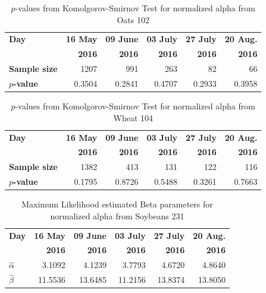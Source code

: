 \documentclass[journal]{IEEEtran}
\begin{document}
\begin{table}[hbt]
  \centering
  \caption{$p$-values from Komolgorov-Smirnov Test for normalized alpha from Oats 102}
  \label{tab:pvalues_alpha_ot102}
  \begin{tabular}{lrrrrr}
    \toprule
    \textbf{Day} & \textbf{16 May} & \textbf{09 June} & \textbf{03 July} & \textbf{27 July} & \textbf{20 Aug.}\\ 
                 & \textbf{2016} & \textbf{2016} & \textbf{2016} & \textbf{2016} & \textbf{2016}\\\midrule
    \textbf{Sample size} & 1207 & 991 & 263 & 82 & 66\\
    \textbf{$p$-value} & 0.3504 & 0.2841 & 0.4707 & 0.2933 & 0.3958\\
    \bottomrule
  \end{tabular}
\end{table}

\begin{table}[hbt]
  \centering
  \caption{$p$-values from Komolgorov-Smirnov Test for normalized alpha from Wheat 104}
  \label{tab:pvalues_alpha_wt104}
  \begin{tabular}{lrrrrr}
    \toprule
    \textbf{Day} & \textbf{16 May} & \textbf{09 June} & \textbf{03 July} & \textbf{27 July} & \textbf{20 Aug.}\\ 
                 & \textbf{2016} & \textbf{2016} & \textbf{2016} & \textbf{2016} & \textbf{2016}\\\midrule
    \textbf{Sample size} & 1382 & 413 & 131 & 122 & 116\\
    \textbf{$p$-value} & 0.1795 & 0.8726 & 0.5488 & 0.3261 & 0.7663\\
    \bottomrule
  \end{tabular}
\end{table}

\begin{table}[hbt]
  \centering
  \caption{Maximum Likelihood estimated Beta parameters for normalized alpha from Soybeans 231}
  \label{tab:params_helicity}
  \begin{tabular}{lrrrrr}
    \toprule
    \textbf{Day} & \textbf{16 May} & \textbf{09 June} & \textbf{03 July} & \textbf{27 July} & \textbf{20 Aug.}\\ 
                 & \textbf{2016} & \textbf{2016} & \textbf{2016} & \textbf{2016} & \textbf{2016}\\\midrule
    \textbf{$\hat{\alpha}$} & 3.1092 & 4.1239 & 3.7793 & 4.6720 & 4.8640\\
    \textbf{$\hat{\beta}$} & 11.5536 & 13.6485 & 11.2156 & 13.8374 & 13.8050\\
    \bottomrule
  \end{tabular}
\end{table}
\end{document}
